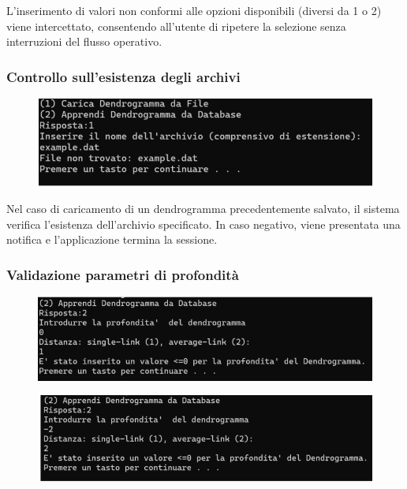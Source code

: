 L'inserimento di valori non conformi alle opzioni disponibili (diversi da 1 o 2) viene intercettato, consentendo all'utente di ripetere la selezione senza interruzioni del flusso operativo.

\subsubsection{Controllo sull'esistenza degli archivi} 
\begin{figure}[h!]
    \centering
    \includegraphics[width=\textwidth]{images/controllo_archivi.png}
\end{figure}
Nel caso di caricamento di un dendrogramma precedentemente salvato, il sistema verifica l'esistenza dell'archivio specificato. In caso negativo, viene presentata una notifica e l'applicazione termina la sessione.

\subsubsection{Validazione parametri di profondità} 
    \begin{figure}[h!]
        \centering
        \includegraphics[width=\textwidth]{images/0_valore_errato.png}
    \end{figure}

    \begin{figure}[h!]
        \centering
        \includegraphics[width=\textwidth]{images/-2_valore_errato.png}
    \end{figure}

